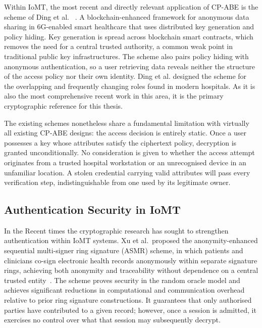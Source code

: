 Within IoMT, the most recent and directly relevant application of CP-ABE is the scheme of Ding et al. ~\cite{ding2026badsabe}. A blockchain-enhanced framework for anonymous data sharing in 6G-enabled smart healthcare that uses distributed key generation and policy hiding. Key generation is spread across blockchain smart contracts, which removes the need for a central trusted authority, a common weak point in traditional public key infrastructures. The scheme also pairs policy hiding with anonymous authentication, so a user retrieving data reveals neither the structure of the access policy nor their own identity. Ding et al. designed the scheme for the overlapping and frequently changing roles found in modern hospitals. As it is also the most comprehensive recent work in this area, it is the primary cryptographic reference for this thesis.

The existing schemes nonetheless share a fundamental limitation with virtually all existing CP-ABE designs: the access decision is entirely static. Once a user possesses a key whose attributes satisfy the ciphertext policy, decryption is granted unconditionally. No consideration is given to whether the access attempt originates from a trusted hospital workstation or an unrecognised device in an unfamiliar location. A stolen credential carrying valid attributes will pass every verification step, indistinguishable from one used by its legitimate owner.

\subsection{Authentication Security in IoMT} %
\label{sec1.1.2}

In the Recent times the cryptographic research has sought to strengthen authentication within IoMT systems. Xu et al.\ proposed the anonymity-enhanced sequential multi-signer ring signature (ASMR) scheme, in which patients and clinicians co-sign electronic health records anonymously within separate signature rings, achieving both anonymity and traceability without dependence on a central trusted entity~\cite{xu2025asmr}. The scheme proves security in the random oracle model and achieves significant reductions in computational and communication overhead relative to prior ring signature constructions. It guarantees that only authorised parties have contributed to a given record; however, once a session is admitted, it exercises no control over what that session may subsequently decrypt.

